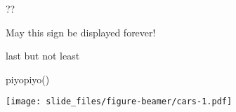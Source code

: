 \documentclass[
  ignorenonframetext,
]{beamer}
\newenvironment{Shaded}{\begin{snugshade}}{\end{snugshade}}
\newcommand{\FunctionTok}[1]{\textcolor[rgb]{0.00,0.00,0.00}{#1}}
\newcommand{\NormalTok}[1]{#1}
\let\oldShaded\Shaded
\let\endoldShaded\endShaded
\renewenvironment{Shaded}{\footnotesize\oldShaded}{\endoldShaded}
\begin{document}
\begin{frame}{??}
\protect\hypertarget{section-4}{}
\Huge

\end{frame}

\begin{frame}{May this sign be displayed forever!}
\protect\hypertarget{may-this-sign-be-displayed-forever}{}
\vspace*{-4pt}
\end{frame}

\begin{frame}[fragile]{last but not least}
\protect\hypertarget{last-but-not-least}{}
\begin{Shaded}
\begin{Highlighting}[]
\FunctionTok{piyopiyo}\NormalTok{()}
\end{Highlighting}
\end{Shaded}

\texttt{[image: slide\_files/figure-beamer/cars-1.pdf]}
\end{frame}
\end{document}
